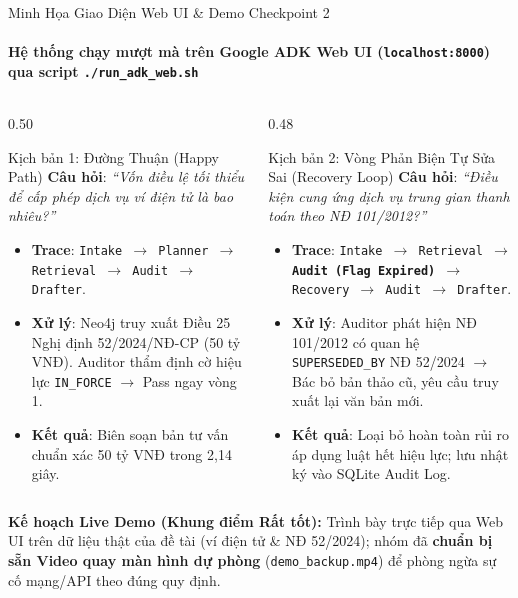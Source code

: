 \documentclass[aspectratio=169,10pt,xcolor={table}]{beamer}
\begin{document}
\begin{frame}{Minh Họa Giao Diện Web UI \& Demo Checkpoint 2}
\framesubtitle{Hệ thống chạy mượt mà trên Google ADK Web UI (\texttt{localhost:8000}) qua script \texttt{./run\_adk\_web.sh}}
\begin{columns}[T]
\begin{column}{0.50\textwidth}
\begin{block}{\small Kịch bản 1: Đường Thuận (Happy Path)}
\footnotesize
\textbf{Câu hỏi}: \emph{``Vốn điều lệ tối thiểu để cấp phép dịch vụ ví điện tử là bao nhiêu?''}
\begin{itemize}\scriptsize
  \item \textbf{Trace}: \texttt{Intake $\to$ Planner $\to$ Retrieval $\to$ Audit $\to$ Drafter}.
  \item \textbf{Xử lý}: Neo4j truy xuất Điều 25 Nghị định 52/2024/NĐ-CP (50 tỷ VNĐ). Auditor thẩm định cờ hiệu lực \texttt{IN\_FORCE} $\to$ Pass ngay vòng 1.
  \item \textbf{Kết quả}: Biên soạn bản tư vấn chuẩn xác 50 tỷ VNĐ trong 2,14 giây.
\end{itemize}
\end{block}
\end{column}

\begin{column}{0.48\textwidth}
\begin{block}{\small Kịch bản 2: Vòng Phản Biện Tự Sửa Sai (Recovery Loop)}
\footnotesize
\textbf{Câu hỏi}: \emph{``Điều kiện cung ứng dịch vụ trung gian thanh toán theo NĐ 101/2012?''}
\begin{itemize}\scriptsize
  \item \textbf{Trace}: \texttt{Intake $\to$ Retrieval $\to$ \textbf{Audit (Flag Expired)} $\to$ Recovery $\to$ Audit $\to$ Drafter}.
  \item \textbf{Xử lý}: Auditor phát hiện NĐ 101/2012 có quan hệ \texttt{SUPERSEDED\_BY} NĐ 52/2024 $\to$ Bác bỏ bản thảo cũ, yêu cầu truy xuất lại văn bản mới.
  \item \textbf{Kết quả}: Loại bỏ hoàn toàn rủi ro áp dụng luật hết hiệu lực; lưu nhật ký vào SQLite Audit Log.
\end{itemize}
\end{block}
\end{column}
\end{columns}
\vskip0.12cm
\begin{tcolorbox}[colback=codebg,colframe=hcmutblue!50,boxrule=0.5pt,top=2pt,bottom=2pt,left=4pt,right=4pt]
\scriptsize\textbf{Kế hoạch Live Demo (Khung điểm Rất tốt):} Trình bày trực tiếp qua Web UI trên dữ liệu thật của đề tài (ví điện tử \& NĐ 52/2024); nhóm đã \textbf{chuẩn bị sẵn Video quay màn hình dự phòng} (\texttt{demo\_backup.mp4}) để phòng ngừa sự cố mạng/API theo đúng quy định.
\end{tcolorbox}
\end{frame}
\end{document}
